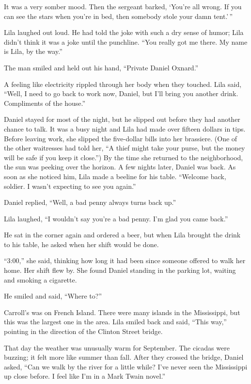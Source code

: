 \documentclass[
  american,
  letterpaper,
]{book}
\begin{document}
It was a very somber mood. Then the sergeant barked, `You're all wrong.
If you can see the stars when you're in bed, then somebody stole your
damn tent.'\,''

Lila laughed out loud. He had told the joke with such a dry sense of
humor; Lila didn't think it was a joke until the punchline. ``You really
got me there. My name is Lila, by the way.''

The man smiled and held out his hand, ``Private Daniel Oxnard.''

A feeling like electricity rippled through her body when they touched.
Lila said, ``Well, I need to go back to work now, Daniel, but I'll bring
you another drink. Compliments of the house.''

Daniel stayed for most of the night, but he slipped out before they had
another chance to talk. It was a busy night and Lila had made over
fifteen dollars in tips. Before leaving work, she slipped the
five-dollar bills into her brassiere. (One of the other waitresses had
told her, ``A thief might take your purse, but the money will be safe if
you keep it close.'') By the time she returned to the neighborhood, the
sun was peeking over the horizon. A few nights later, Daniel was back.
As soon as she noticed him, Lila made a beeline for his table. ``Welcome
back, soldier. I wasn't expecting to see you again.''

Daniel replied, ``Well, a bad penny always turns back up.''

Lila laughed, ``I wouldn't say you're a bad penny. I'm glad you came
back.''

He sat in the corner again and ordered a beer, but when Lila brought the
drink to his table, he asked when her shift would be done.

``3:00,'' she said, thinking how long it had been since someone offered
to walk her home. Her shift flew by. She found Daniel standing in the
parking lot, waiting and smoking a cigarette.

He smiled and said, ``Where to?''

Carroll's was on French Island. There were many islands in the
Mississippi, but this was the largest one in the area. Lila smiled back
and said, ``This way,'' pointing in the direction of the Clinton Street
bridge.

That day the weather was unusually warm for September. The cicadas were
buzzing; it felt more like summer than fall. After they crossed the
bridge, Daniel asked, ``Can we walk by the river for a little while?
I've never seen the Mississippi up close before. I feel like I'm in a
Mark Twain novel.''
\end{document}

